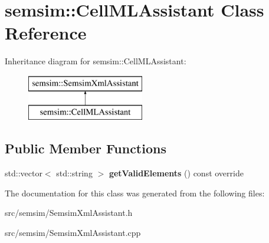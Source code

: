 \hypertarget{classsemsim_1_1CellMLAssistant}{}\section{semsim\+:\+:Cell\+M\+L\+Assistant Class Reference}
\label{classsemsim_1_1CellMLAssistant}
Inheritance diagram for semsim\+:\+:Cell\+M\+L\+Assistant\+:\begin{figure}[H]
\begin{center}
\leavevmode
\includegraphics[height=2.000000cm]{classsemsim_1_1CellMLAssistant}
\end{center}
\end{figure}
\subsection*{Public Member Functions}
\begin{DoxyCompactItemize}
\item 
\mbox{\label{classsemsim_1_1CellMLAssistant_a0b18cb5b3d702a136680e7da28274d8a}} 
std\+::vector$<$ std\+::string $>$ {\bfseries get\+Valid\+Elements} () const override
\end{DoxyCompactItemize}


The documentation for this class was generated from the following files\+:\begin{DoxyCompactItemize}
\item 
src/semsim/Semsim\+Xml\+Assistant.\+h\item 
src/semsim/Semsim\+Xml\+Assistant.\+cpp\end{DoxyCompactItemize}
